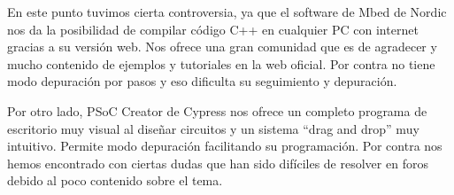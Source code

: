 En este punto tuvimos cierta controversia, ya que el software de Mbed de Nordic nos da la posibilidad de compilar código C++ en cualquier PC con internet gracias a su versión web. Nos ofrece una gran comunidad que es de agradecer y mucho contenido de ejemplos y tutoriales en la web oficial. Por contra no tiene modo depuración por pasos y eso dificulta su seguimiento y depuración. 

Por otro lado, PSoC Creator de Cypress nos ofrece un completo programa de escritorio muy visual al diseñar circuitos y un sistema “drag and drop” muy intuitivo. Permite modo depuración facilitando su programación. Por contra nos hemos encontrado con ciertas dudas que han sido difíciles de resolver en foros debido al poco contenido sobre el tema.